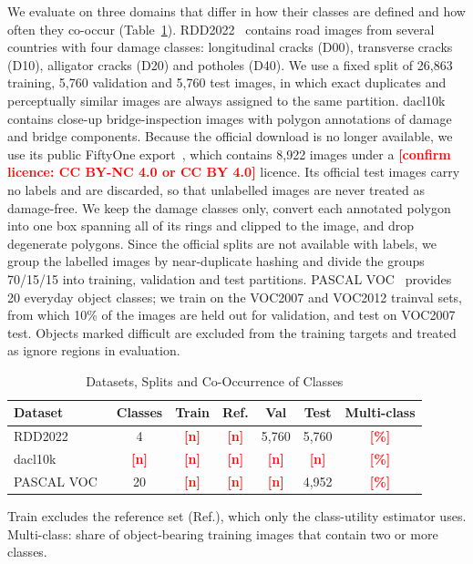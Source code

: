 \documentclass[conference]{IEEEtran}
\newcommand{\todo}[1]{\textcolor{red}{\textbf{[#1]}}}
\begin{document}
We evaluate on three domains that differ in how their classes are defined and how often they co-occur (Table~\ref{tab:datasets}). RDD2022~\cite{arya2024rdd} contains road images from several countries with four damage classes: longitudinal cracks (D00), transverse cracks (D10), alligator cracks (D20) and potholes (D40). We use a fixed split of 26,863 training, 5,760 validation and 5,760 test images, in which exact duplicates and perceptually similar images are always assigned to the same partition. dacl10k~\cite{flotzinger2024dacl10k} contains close-up bridge-inspection images with polygon annotations of damage and bridge components. Because the official download is no longer available, we use its public FiftyOne export~\cite{voxel51dacl10k}, which contains 8,922 images under a \todo{confirm licence: CC BY-NC 4.0 or CC BY 4.0} licence. Its official test images carry no labels and are discarded, so that unlabelled images are never treated as damage-free. We keep the damage classes only, convert each annotated polygon into one box spanning all of its rings and clipped to the image, and drop degenerate polygons. Since the official splits are not available with labels, we group the labelled images by near-duplicate hashing and divide the groups 70/15/15 into training, validation and test partitions. PASCAL VOC~\cite{everingham2010voc} provides 20 everyday object classes; we train on the VOC2007 and VOC2012 trainval sets, from which 10\% of the images are held out for validation, and test on VOC2007 test. Objects marked difficult are excluded from the training targets and treated as ignore regions in evaluation.

\begin{table}[t]
\caption{Datasets, Splits and Co-Occurrence of Classes}
\label{tab:datasets}
\centering
\footnotesize
\setlength{\tabcolsep}{3pt}
\begin{tabular}{@{}lcccccc@{}}
\toprule
\textbf{Dataset} & \textbf{Classes} & \textbf{Train} & \textbf{Ref.} & \textbf{Val} & \textbf{Test} & \textbf{Multi-class} \\
\midrule
RDD2022~\cite{arya2024rdd} & 4 & \todo{n} & \todo{n} & 5,760 & 5,760 & \todo{\%} \\
dacl10k~\cite{flotzinger2024dacl10k} & \todo{n} & \todo{n} & \todo{n} & \todo{n} & \todo{n} & \todo{\%} \\
PASCAL VOC~\cite{everingham2010voc} & 20 & \todo{n} & \todo{n} & \todo{n} & 4,952 & \todo{\%} \\
\bottomrule
\end{tabular}
\vspace{2pt}

\parbox{\columnwidth}{\footnotesize Train excludes the reference set (Ref.), which only the class-utility estimator uses. Multi-class: share of object-bearing training images that contain two or more classes.}
\end{table}
\end{document}
